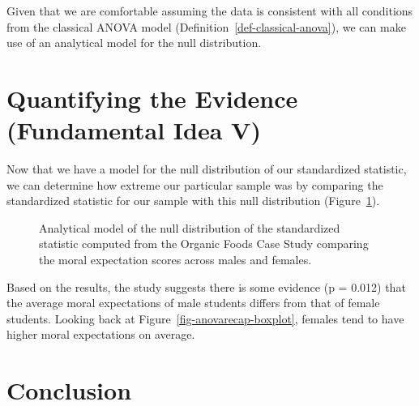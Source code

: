 \documentclass[
  letterpaper,
  DIV=11,
  numbers=noendperiod]{scrreprt}
\theoremstyle{plain}
\theoremstyle{definition}
\theoremstyle{definition}
\theoremstyle{remark}
\begin{document}
Given that we are comfortable assuming the data is consistent with all
conditions from the classical ANOVA model
(Definition~\ref{def-classical-anova}), we can make use of an analytical
model for the null distribution.

\section{Quantifying the Evidence (Fundamental Idea
V)}\label{quantifying-the-evidence-fundamental-idea-v-1}

Now that we have a model for the null distribution of our standardized
statistic, we can determine how extreme our particular sample was by
comparing the standardized statistic for our sample with this null
distribution (Figure~\ref{fig-anovarecap-null-distribution}).

\begin{figure}


\caption{\label{fig-anovarecap-null-distribution}Analytical model of the
null distribution of the standardized statistic computed from the
Organic Foods Case Study comparing the moral expectation scores across
males and females.}

\end{figure}%

Based on the results, the study suggests there is some evidence (p =
0.012) that the average moral expectations of male students differs from
that of female students. Looking back at
Figure~\ref{fig-anovarecap-boxplot}, females tend to have higher moral
expectations on average.

\section{Conclusion}\label{conclusion}
\end{document}
